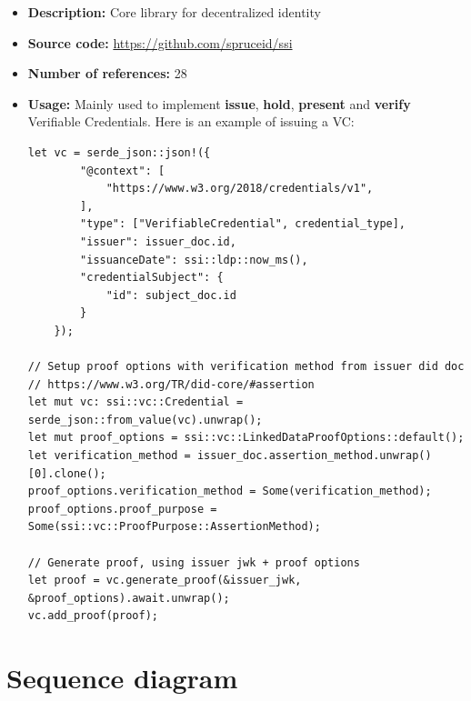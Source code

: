 \begin{itemize}
\item
  \textbf{Description:} Core library for decentralized identity
\item
  \textbf{Source code:} \url{https://github.com/spruceid/ssi}
\item
  \textbf{Number of references:} 28
\item
  \textbf{Usage:} Mainly used to implement \textbf{issue},
  \textbf{hold}, \textbf{present} and \textbf{verify} Verifiable
  Credentials. Here is an example of issuing a VC:

\begin{lstlisting}
let vc = serde_json::json!({
        "@context": [
            "https://www.w3.org/2018/credentials/v1",
        ],
        "type": ["VerifiableCredential", credential_type],
        "issuer": issuer_doc.id,
        "issuanceDate": ssi::ldp::now_ms(),
        "credentialSubject": {
            "id": subject_doc.id
        }
    });

// Setup proof options with verification method from issuer did doc 
// https://www.w3.org/TR/did-core/#assertion
let mut vc: ssi::vc::Credential = serde_json::from_value(vc).unwrap();
let mut proof_options = ssi::vc::LinkedDataProofOptions::default();
let verification_method = issuer_doc.assertion_method.unwrap()[0].clone();
proof_options.verification_method = Some(verification_method);
proof_options.proof_purpose = Some(ssi::vc::ProofPurpose::AssertionMethod);

// Generate proof, using issuer jwk + proof options
let proof = vc.generate_proof(&issuer_jwk, &proof_options).await.unwrap();
vc.add_proof(proof);
\end{lstlisting}
\end{itemize}

\hypertarget{sequence-diagram}{%
\section{Sequence diagram}\label{sequence-diagram}}

